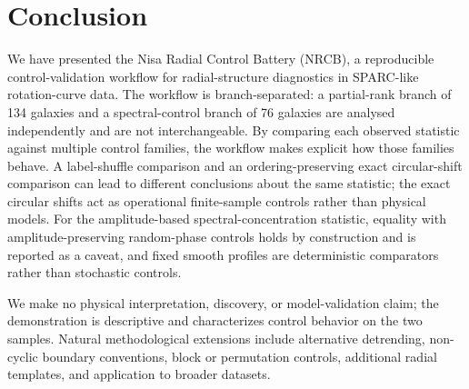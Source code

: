 \section{Conclusion}
\label{sec:conclusion}

We have presented the Nisa Radial Control Battery (NRCB), a reproducible
control-validation workflow for radial-structure diagnostics in SPARC-like
rotation-curve data. The workflow is branch-separated: a partial-rank branch
of 134 galaxies and a
spectral-control branch of 76 galaxies are analysed independently and are
not interchangeable. By comparing each observed statistic against multiple
control families, the workflow makes explicit how those families behave. A
label-shuffle comparison and an ordering-preserving exact circular-shift
comparison can lead to different conclusions about the same statistic; the
exact circular shifts act as operational finite-sample controls rather than
physical models. For the amplitude-based spectral-concentration statistic,
equality with amplitude-preserving random-phase controls holds by
construction and is reported as a caveat, and fixed smooth profiles are
deterministic comparators rather than stochastic controls.

We make no physical interpretation, discovery, or model-validation claim;
the demonstration is descriptive and characterizes control behavior on the
two samples. Natural methodological extensions include alternative
detrending, non-cyclic boundary conventions, block or permutation controls,
additional radial templates, and application to broader datasets.
